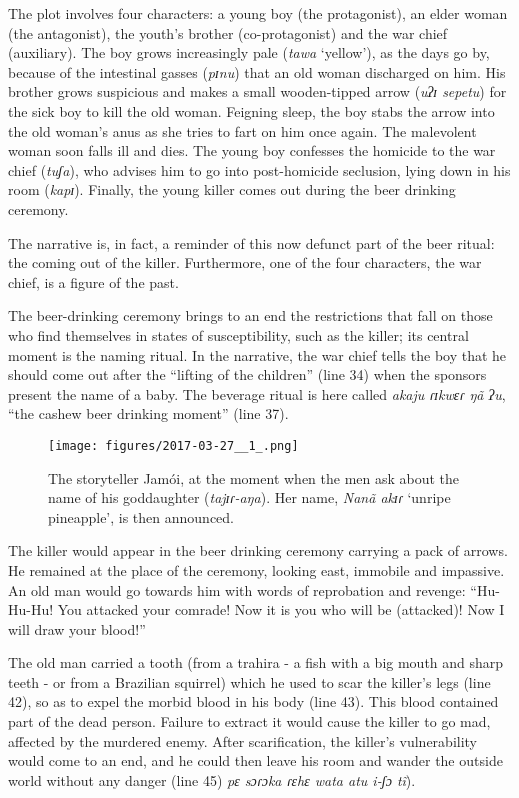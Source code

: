 \documentclass[output=paper,
modfonts,nonflat
]{langsci/langscibook}
\begin{document}
	The plot involves four characters: a young boy (the protagonist), an elder woman (the antagonist), the youth’s brother (co-protagonist) and the war chief (auxiliary). The boy grows increasingly pale (\emph{tawa} ‘yellow’), as the days go by, because of the intestinal gasses (\emph {pɪnu}) that an old woman discharged on him. His brother grows suspicious and makes a small wooden-tipped arrow (\emph {uʔɪ sepetu}) for the sick boy to kill the old woman. Feigning sleep, the boy stabs the arrow into the old woman’s anus as she tries to fart on him once again. The malevolent woman soon falls ill and dies. The young boy confesses the homicide to the war chief (\emph {tuʃa}), who advises him to go into post-homicide seclusion, lying down in his room (\emph {kapɪ}). Finally, the young killer comes out during the beer drinking ceremony.

\newpage 	
	The narrative is, in fact, a reminder of this now defunct part of the beer ritual: the coming out of the killer. Furthermore, one of the four characters, the war chief, is a figure of the past.
    
	The beer-drinking ceremony brings to an end the restrictions that fall on those who find themselves in states of susceptibility, such as the killer; its central moment is the naming ritual. In the narrative, the war chief tells the boy that he should come out after the “lifting of the children” (line 34) when the sponsors present the name of a baby. The beverage ritual is here called \emph{akaju ɾɪkwɛɾ ŋã ʔu}, “the cashew beer drinking moment” (line 37).
\begin{figure}[h!]
  \caption{The storyteller Jamói, at the moment when the men ask about the name of his goddaughter (\emph{tajɪɾ-aŋa}). Her name, \emph{Nanã akɪɾ} ‘unripe pineapple', is then announced.}
  \centering
\texttt{[image: figures/2017-03-27\_\_1\_.png]}
\end{figure}
    
	The killer would appear in the beer drinking ceremony carrying a pack of arrows. He remained at the place of the ceremony, looking east, immobile and impassive. An old man would go towards him with words of reprobation and revenge: “Hu-Hu-Hu! You attacked your comrade! Now it is you who will be (attacked)! Now I will draw your blood!”
    
\largerpage[2]    
	The old man carried a tooth (from a trahira - a fish with a big mouth and sharp teeth - or from a Brazilian squirrel) which he used to scar the killer's legs (line 42), so as to expel the morbid blood in his body (line 43). This blood contained part of the dead person. Failure to extract it would cause the killer to go mad, affected by the murdered enemy. After scarification, the killer’s vulnerability would come to an end, and he could then leave his room and wander the outside world without any danger (line 45) \emph{pɛ sɔɾɔka ɾɛhɛ wata atu i-ʃɔ tĩ}).
\end{document}
